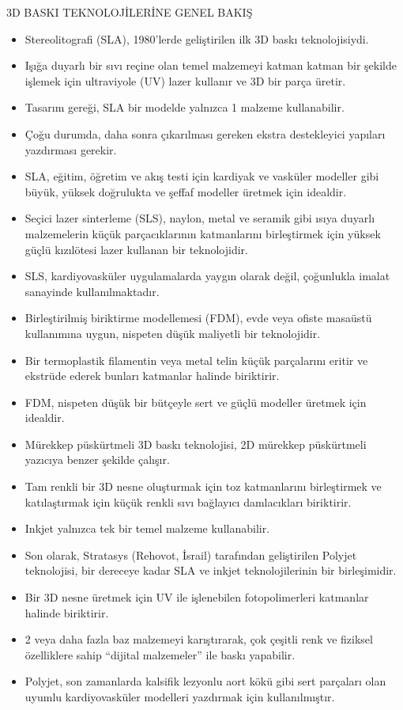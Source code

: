 \documentclass{beamer}
\begin{document}
\begin{frame}[allowframebreaks]{3D BASKI TEKNOLOJİLERİNE GENEL BAKIŞ}

\begin{itemize}
    \item Stereolitografi (SLA), 1980'lerde geliştirilen ilk 3D baskı teknolojisiydi. 
    \item Işığa duyarlı bir sıvı reçine olan temel malzemeyi katman katman bir şekilde işlemek için ultraviyole (UV) lazer kullanır ve 3D bir parça üretir.
    \item Tasarım gereği, SLA bir modelde yalnızca 1 malzeme kullanabilir. 
    \item Çoğu durumda, daha sonra çıkarılması gereken ekstra destekleyici yapıları yazdırması gerekir. 
    \item SLA, eğitim, öğretim ve akış testi için kardiyak ve vasküler modeller gibi büyük, yüksek doğrulukta ve şeffaf modeller üretmek için idealdir. 
    \item Seçici lazer sinterleme (SLS), naylon, metal ve seramik gibi ısıya duyarlı malzemelerin küçük parçacıklarının katmanlarını birleştirmek için yüksek güçlü kızılötesi lazer kullanan bir teknolojidir. 
    \item SLS, kardiyovasküler uygulamalarda yaygın olarak değil, çoğunlukla imalat sanayinde kullanılmaktadır. 
    \item Birleştirilmiş biriktirme modellemesi (FDM), evde veya ofiste masaüstü kullanımına uygun, nispeten düşük maliyetli bir teknolojidir. 
    \item Bir termoplastik filamentin veya metal telin küçük parçalarını eritir ve ekstrüde ederek bunları katmanlar halinde biriktirir. 
    \item FDM, nispeten düşük bir bütçeyle sert ve güçlü modeller üretmek için idealdir.
    \item Mürekkep püskürtmeli 3D baskı teknolojisi, 2D mürekkep püskürtmeli yazıcıya benzer şekilde çalışır. 
    \item Tam renkli bir 3D nesne oluşturmak için toz katmanlarını birleştirmek ve katılaştırmak için küçük renkli sıvı bağlayıcı damlacıkları biriktirir. 
    \item Inkjet yalnızca tek bir temel malzeme kullanabilir. 
    \item Son olarak, Stratasys (Rehovot, İsrail) tarafından geliştirilen Polyjet teknolojisi, bir dereceye kadar SLA ve inkjet teknolojilerinin bir birleşimidir. 
    \item Bir 3D nesne üretmek için UV ile işlenebilen fotopolimerleri katmanlar halinde biriktirir. 
    \item 2 veya daha fazla baz malzemeyi karıştırarak, çok çeşitli renk ve fiziksel özelliklere sahip “dijital malzemeler” ile baskı yapabilir. 
    \item Polyjet, son zamanlarda kalsifik lezyonlu aort kökü gibi sert parçaları olan uyumlu kardiyovasküler modelleri yazdırmak için kullanılmıştır. 
\end{itemize}

\end{frame}
\end{document}
